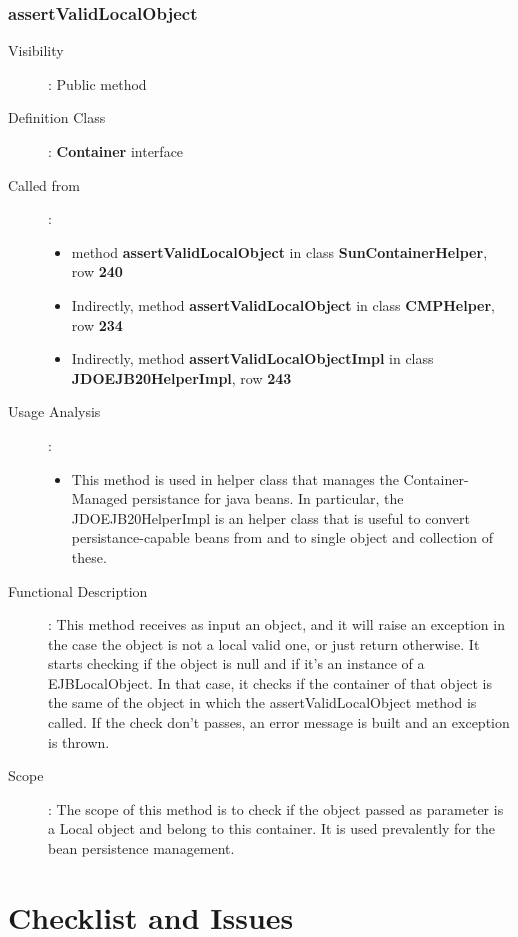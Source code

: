 \documentclass[11pt, a4paper,titlepage]{article}
\begin{document}
	 \subsubsection{assertValidLocalObject}
	 \begin{description}
	 	\item[Visibility]: Public method
	 	\item[Definition Class]: \textbf{Container} interface
	 	\item[Called from]: 
	 	\begin{itemize}
	 		\item method \textbf{assertValidLocalObject} in class \textbf{SunContainerHelper}, row \textbf{240}
	 		\item Indirectly, method \textbf{assertValidLocalObject} in class \textbf{CMPHelper}, row \textbf{234}
	 		
	 		\item Indirectly, method \textbf{assertValidLocalObjectImpl} in class \textbf{JDOEJB20HelperImpl}, row \textbf{243}
	 	\end{itemize}
	 	\item[Usage Analysis]: 
	 	\begin{itemize}
	 		\item This method is used in helper class that manages the Container-Managed persistance for java beans. \newline In particular, the JDOEJB20HelperImpl is an helper class that is useful to convert persistance-capable beans from and to single object and collection of these.
	 		
	 	\end{itemize} 
	 	\item[Functional Description]: This method receives as input an object, and it will raise an exception in the case the object is not a local valid one, or just return otherwise. It starts checking if the object is null and if it's an instance of a EJBLocalObject. In that case, it checks if the container of that object is the same of the object in which the assertValidLocalObject method is called. If the check don't passes, an error message is built and an exception is thrown.
	 	\item[Scope]: The scope of this method is to check if the object passed as parameter is a Local object and belong to this container. It is used prevalently for the bean persistence management.  
	 \end{description}
\section{Checklist and Issues}
\end{document}
